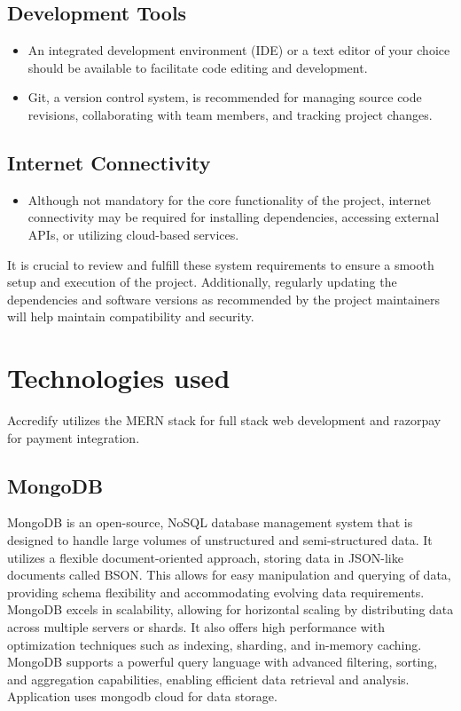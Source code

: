 \documentclass[a4paper,11pt]{report}
\begin{document}
\section{Development Tools}
\begin{itemize}
  \item An integrated development environment (IDE) or a text editor of your choice should be available to facilitate code editing and development.
  \item Git, a version control system, is recommended for managing source code revisions, collaborating with team members, and tracking project changes.
\end{itemize}

\section{Internet Connectivity}
\begin{itemize}
  \item Although not mandatory for the core functionality of the project, internet connectivity may be required for installing dependencies, accessing external APIs, or utilizing cloud-based services.
\end{itemize}
It is crucial to review and fulfill these system requirements to ensure a smooth setup and execution of the project. Additionally, regularly updating the dependencies and software versions as recommended by the project maintainers will help maintain compatibility and security.


\chapter{Technologies used}

Accredify utilizes the MERN stack for full stack web development and razorpay for payment integration.

\section{MongoDB}
MongoDB is an open-source, NoSQL database management system that is designed to handle large volumes of unstructured and semi-structured data. It utilizes a flexible document-oriented approach, storing data in JSON-like documents called BSON. This allows for easy manipulation and querying of data, providing schema flexibility and accommodating evolving data requirements. MongoDB excels in scalability, allowing for horizontal scaling by distributing data across multiple servers or shards. It also offers high performance with optimization techniques such as indexing, sharding, and in-memory caching. MongoDB supports a powerful query language with advanced filtering, sorting, and aggregation capabilities, enabling efficient data retrieval and analysis. Application uses mongodb cloud for data storage.
\end{document}
